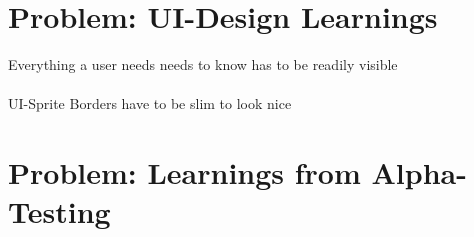 \documentclass[a4paper,american]{paper}
\begin{document}
\section*{Problem: UI-Design Learnings}
Everything a user needs needs to know has to be readily visible  \\\\
UI-Sprite Borders have to be slim to look nice

\section*{Problem: Learnings from Alpha-Testing}
\end{document}
